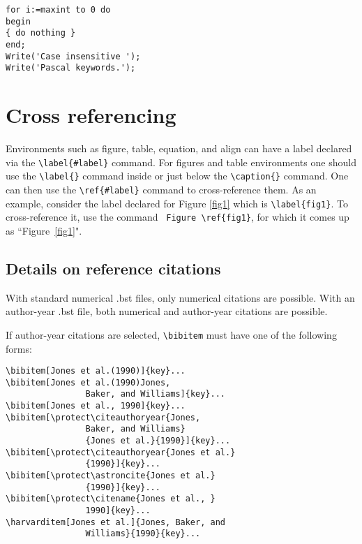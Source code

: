 \documentclass[unnumsec,webpdf,contemporary,large]{oup-authoring-template}%
\theoremstyle{thmstyleone}%
\theoremstyle{thmstyletwo}%
\theoremstyle{thmstylethree}%
\begin{document}
\begin{minipage}{\hsize}%
	\lstset{language=Pascal}%
	\begin{lstlisting}[frame=single,framexleftmargin=-1pt,framexrightmargin=-17pt,framesep=12pt,linewidth=0.98\textwidth]
for i:=maxint to 0 do
begin
{ do nothing }
end;
Write('Case insensitive ');
Write('Pascal keywords.');
\end{lstlisting}
\end{minipage}


\section{Cross referencing}\label{sec8}

Environments such as figure, table, equation, and align can have a label
declared via the \verb+\label{#label}+ command. For figures and table
environments one should use the \verb+\label{}+ command inside or just
below the \verb+\caption{}+ command.  One can then use the
\verb+\ref{#label}+ command to cross-reference them. As an example, consider
the label declared for Figure \ref{fig1} which is
\verb+\label{fig1}+. To cross-reference it, use the command
\verb+ Figure \ref{fig1}+, for which it comes up as
``Figure~\ref{fig1}".

\subsection{Details on reference citations}\label{subsec3}

With standard numerical .bst files, only numerical citations are possible.
With an author-year .bst file, both numerical and author-year citations are possible.

If author-year citations are selected, \verb+\bibitem+ must have one of the following forms:


{\footnotesize%
\begin{verbatim}
\bibitem[Jones et al.(1990)]{key}...
\bibitem[Jones et al.(1990)Jones,
                Baker, and Williams]{key}...
\bibitem[Jones et al., 1990]{key}...
\bibitem[\protect\citeauthoryear{Jones,
                Baker, and Williams}
                {Jones et al.}{1990}]{key}...
\bibitem[\protect\citeauthoryear{Jones et al.}
                {1990}]{key}...
\bibitem[\protect\astroncite{Jones et al.}
                {1990}]{key}...
\bibitem[\protect\citename{Jones et al., }
                1990]{key}...
\harvarditem[Jones et al.]{Jones, Baker, and
                Williams}{1990}{key}...
\end{verbatim}}
\end{document}
